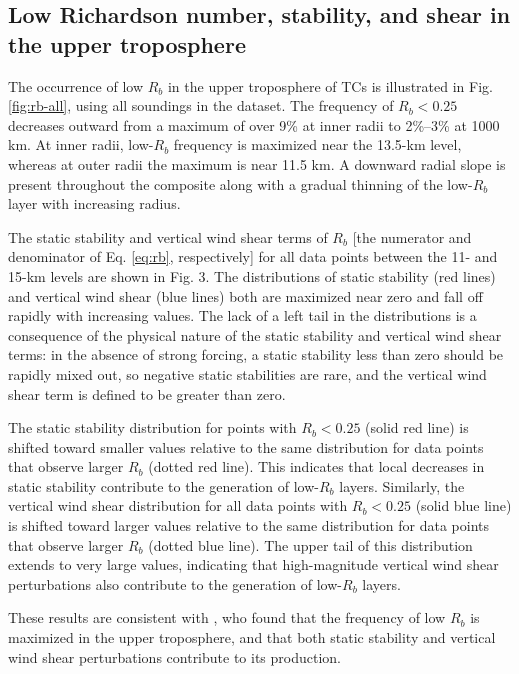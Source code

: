 \subsection{Low Richardson number, stability, and shear in the upper troposphere}

The occurrence of low $R_b$ in the upper troposphere of TCs is illustrated in Fig. \ref{fig:rb-all}, using all soundings in the dataset.
The frequency of $R_b < 0.25$ decreases outward from a maximum of over 9\% at inner radii to 2\%–3\% at 1000 km.
At inner radii, low-$R_b$ frequency is maximized near the 13.5-km level, whereas at outer radii the maximum is near 11.5 km.
A downward radial slope is present throughout the composite along with a gradual thinning of the low-$R_b$ layer with increasing radius.

The static stability and vertical wind shear terms of $R_b$ [the  numerator  and  denominator  of  Eq. \ref{eq:rb},  respectively] for all data points between the 11- and 15-km levels are shown in Fig. 3.
The distributions of static stability (red lines) and vertical wind shear (blue lines) both are maximized near zero and fall off rapidly with increasing values.
The lack of a left tail in the distributions is a consequence of the physical nature of the static stability and vertical wind shear terms: in the absence of strong forcing, a static stability less than zero should be rapidly mixed out, so negative static stabilities are rare, and the vertical wind shear term is defined to be greater than zero.

The static stability distribution for points with $R_b < 0.25$ (solid red line) is shifted toward smaller values relative to the same distribution for data points that observe larger $R_b$ (dotted red line).
This indicates that local decreases in static stability contribute to the generation of low-$R_b$ layers.
Similarly, the vertical wind shear distribution for all data points with $R_b < 0.25$ (solid blue line) is shifted toward larger values relative to the same distribution for data points that observe larger $R_b$ (dotted blue line).
The upper tail of this distribution extends to very large values, indicating that high-magnitude vertical wind shear perturbations also contribute to the generation of low-$R_b$ layers.

These results are consistent with \cite{Molinarietal2014}, who found that the frequency of low $R_b$ is maximized in the upper troposphere, and that both static stability and vertical wind shear perturbations contribute to its production.


